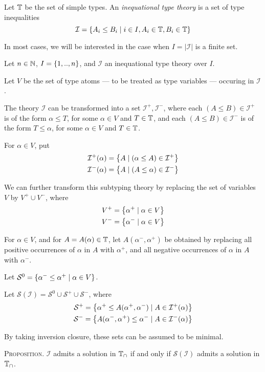 \documentclass{scrartcl}
\newcommand{\mcS}{\mathcal{S}}
\newcommand{\mcI}{\mathcal{I}}
\begin{document}
Let $\mathbb{T}$ be the set of simple types.
An \emph{inequational type theory} is a set of type inequalities
  \[ \mcI = \setof{A_i \le B_i \mid i \in I, A_i \in \types, B_i \in \types} \]

In most cases, we will be interested in the case when $I = |\mcI|$ is a finite set.

Let $n \in \mathbb{N}$, $I = \left\{1,..,n\right\}$, and $\mcI$ an inequational type theory
over $I$.

Let $V$ be the set of type atoms --- to be treated as type variables ---
occuring in $\mcI$.

The theory $\mcI$ can be transformed into a set $\mcI^+,\mcI^-$, where
each $(A \le B) \in \mcI^+$ is of the form $\alpha \le T$,
for some $\alpha \in V$ and $T \in \mathbb{T}$, and
each $(A \le B) \in \mcI^-$ is of the form $T \le \alpha$,
for some $\alpha \in V$ and $T \in \mathbb{T}$.

For $\alpha \in V$, put
\begin{align*}
\mcI^+(\alpha) &= \setof{A \mid (\alpha \le A) \in \mcI^+}\\
\mcI^-(\alpha) &= \setof{A \mid (A \le \alpha) \in \mcI^-}
\end{align*}

We can further transform this subtyping theory by replacing the set of variables
$V$ by $V^+ \cup V^-$, where
\begin{align*}
  V^+ &= \left\{\alpha^+ \mid \alpha \in V\right\} \\
  V^- &= \left\{\alpha^- \mid \alpha \in V\right\}
\end{align*}

For $\alpha \in V$, and for $A=A(\alpha) \in \mathbb{T}$, let $A(\alpha^-,\alpha^+)$
be obtained by replacing all positive occurrences of $\alpha$ in $A$ with $\alpha^+$,
and all negative occurrences of $\alpha$ in $A$ with $\alpha^-$.

Let $\mcS^0 = \setof{\alpha^- \le \alpha^+ \mid \alpha \in V}$.

Let $\mcS(\mcI) = \mcS^0 \cup \mcS^+ \cup \mcS^-$, where
\begin{align*}
  \mcS^+ = \setof{\alpha^+ \le A(\alpha^+,\alpha^-) \mid A \in \mcI^+(\alpha)}\\
  \mcS^- = \setof{A(\alpha^-,\alpha^+) \le \alpha^- \mid A \in \mcI^-(\alpha)}
\end{align*}

By taking inversion closure, these sets can be assumed to be minimal.

\textsc{Proposition.}  $\mcI$ admits a solution in $\mathbb{T}_\cap$ if and only if
$\mcS(\mcI)$ admits a solution in $\mathbb{T}_\cap$.
\end{document}

